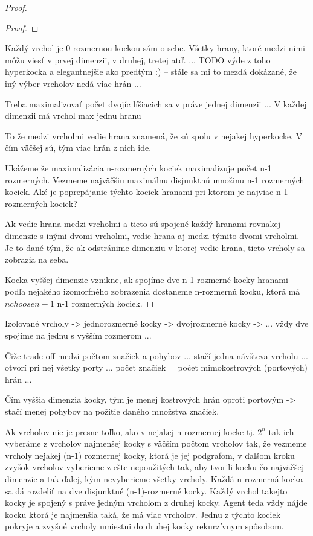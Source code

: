 \begin{proof}
\begin{proof}
\end{proof}






Každý vrchol je 0-rozmernou kockou sám o sebe. Všetky hrany, ktoré medzi
nimi môžu viesť v prvej dimenzii, v druhej, tretej atď. ... TODO
výde z toho hyperkocka a elegantnejšie ako predtým :) -- stále sa mi to
mezdá dokázané, že iný výber vrcholov nedá viac hrán ...

Treba maximalizovať počet dvojíc líšiacich sa v práve jednej dimenzii ...
V každej dimenzii má vrchol max jednu hranu

To že medzi vrcholmi vedie hrana znamená, že sú spolu v nejakej hyperkocke.
V čím väčšej sú, tým viac hrán z nich ide.

Ukážeme že maximalizácia n-rozmerných kociek maximalizuje počet n-1
rozmerných.
Vezmeme najväčšiu maximálnu disjunktnú množinu n-1 rozmerných kociek. Aké je
poprepájanie týchto kociek hranami pri ktorom je najviac n-1 rozmerných
kociek? 

Ak vedie hrana medzi vrcholmi a tieto sú spojené každý
hranami rovnakej dimenzie s inými dvomi vrcholmi, vedie hrana aj medzi
týmito dvomi vrcholmi. Je to dané tým, že ak odstránime dimenziu v ktorej
vedie hrana, tieto vrcholy sa zobrazia na seba.

Kocka vyššej dimenzie vznikne, ak spojíme dve n-1 rozmerné kocky
hranami podľa nejakého izomorfného zobrazenia dostaneme n-rozmernú kocku,
ktorá má $ {n choose {n-1}}$ n-1 rozmerných kociek.

\end{proof}

Izolované vrcholy -> jednorozmerné kocky -> dvojrozmerné kocky -> ... vždy
dve spojíme na jednu s vyšším rozmerom ...



Čiže trade-off medzi počtom značiek a pohybov ... stačí jedna návšteva
vrcholu ... otvorí pri nej všetky porty ... počet značiek = počet mimokostrových
(portových) hrán ... 

Čím vyššia dimenzia kocky, tým je menej kostrových hrán oproti portovým ->
stačí menej pohybov na požitie daného množstva značiek.

Ak vrcholov nie je presne toľko, ako v nejakej n-rozmernej kocke tj. ${2}^{n}$
tak ich vyberáme z vrcholov najmenšej kocky s väčším počtom vrcholov tak, že
vezmeme vrcholy nejakej (n-1) rozmernej kocky, ktorá je jej podgrafom, v
ďalšom kroku zvyšok vrcholov vyberieme z ešte nepoužitých tak, aby tvorili kocku
čo najväčšej dimenzie a tak ďalej, kým nevyberieme všetky vrcholy. Každá
n-rozmerná kocka sa dá rozdeliť na dve disjunktné (n-1)-rozmerné kocky.
Každý vrchol takejto kocky je spojený s práve jedným vrcholom z druhej
kocky. Agent teda vždy nájde kocku ktorá je najmenšia taká, že má viac
vrcholov. Jednu z týchto kociek pokryje a zvyšné vrcholy umiestni do druhej
kocky rekurzívnym spôsobom.

